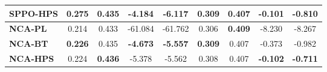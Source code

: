 \begin{table*}[t]
{\begin{tabular}{l|cccc|cccc}
\rowcolor{mygray}
\textbf{SPPO-HPS} & \textbf{{0.275}} & 0.435 & \textbf{{-4.184}} & \textbf{-6.117} & \textbf{0.309} & \textbf{{0.407}} & \textbf{-0.101} & \textbf{-0.810} \\
\midrule
\textbf{NCA-PL} & 0.214 & 0.433 &  -61.084 & -61.762  & 0.306 & \textbf{0.409} &  -8.230 & -8.267 \\
\textbf{NCA-BT} & \textbf{0.226} & 0.435 & \textbf{-4.673} & \textbf{-5.557} & \textbf{0.309} & 0.407 & -0.373 & -0.982 \\
\rowcolor{mygray}
\textbf{NCA-HPS} & 0.224 & \textbf{0.436} & -5.378 & -5.562 & 0.308 & 0.407 & \textbf{-0.102} & \textbf{-0.711} \\
\bottomrule
\end{tabular}}
\vspace{-1em}
\end{table*}
